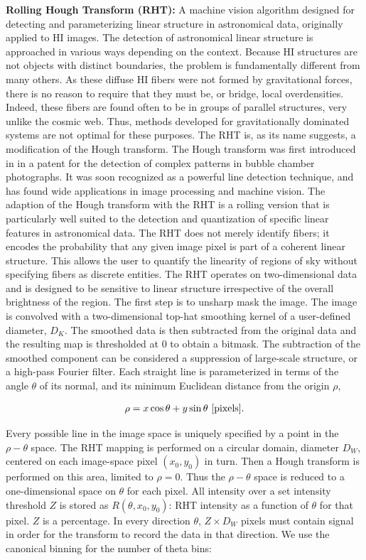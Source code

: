\documentclass[a4paper,10pt]{article}
\begin{document}
{\noindent}\textbf{Rolling Hough Transform (RHT):} A machine vision algorithm designed for detecting and parameterizing linear structure in astronomical data, originally applied to HI images. The detection of astronomical linear structure is approached in various ways depending on the context. Because HI structures are not objects with distinct boundaries, the problem is fundamentally different from many others. As these diffuse HI fibers were not formed by gravitational forces, there is no reason to require that they must be, or bridge, local overdensities. Indeed, these fibers are found often to be in groups of parallel structures, very unlike the cosmic web. Thus, methods developed for gravitationally dominated systems are not optimal for these purposes. The RHT is, as its name suggests, a modification of the Hough transform. The Hough transform was first introduced in in a patent for the detection of complex patterns in bubble chamber photographs. It was soon recognized as a powerful line detection technique, and has found wide applications in image processing and machine vision. The adaption of the Hough transform with the RHT is a rolling version that is particularly well suited to the detection and quantization of specific linear features in astronomical data. The RHT does not merely identify fibers; it encodes the probability that any given image pixel is part of a coherent linear structure. This allows the user to quantify the linearity of regions of sky without specifying fibers as discrete entities. The RHT operates on two-dimensional data and is designed to be sensitive to linear structure irrespective of the overall brightness of the region. The first step is to unsharp mask the image. The image is convolved with a two-dimensional top-hat smoothing kernel of a user-defined diameter, $D_K$. The smoothed data is then subtracted from the original data  and the resulting map is thresholded at 0 to obtain a bitmask. The subtraction of the smoothed component can be considered a suppression of large-scale structure, or a high-pass Fourier filter. Each straight line is parameterized in terms of the angle $\theta$ of its normal, and its minimum Euclidean distance from the origin $\rho$,

\begin{align*}
    \rho = x\cos\theta+y\sin\theta ~ [{\rm pixels}].
\end{align*}

{\noindent}Every possible line in the image space is uniquely specified by a point in the $\rho-\theta$ space. The RHT mapping is performed on a circular domain, diameter $D_W$, centered on each image-space pixel $(x_0,y_0)$ in turn. Then a Hough transform is performed on this area, limited to $\rho=0$. Thus the $\rho-\theta$ space is reduced to a one-dimensional space on $\theta$ for each pixel. All intensity over a set intensity threshold $Z$ is stored as $R(\theta,x_0,y_0)$: RHT intensity as a function of $\theta$ for that pixel. $Z$ is a percentage. In every direction $\theta$, $Z\times D_W$ pixels must contain signal in order for the transform to record the data in that direction. We use the canonical binning for the number of theta bins:
\end{document}
